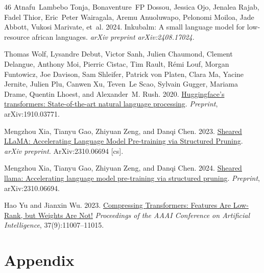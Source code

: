 \documentclass[11pt]{article}
\begin{document}
\begin{thebibliography}{46}
Atnafu~Lambebo Tonja, Bonaventure~FP Dossou, Jessica Ojo, Jenalea Rajab, Fadel Thior, Eric~Peter Wairagala, Aremu Anuoluwapo, Pelonomi Moiloa, Jade Abbott, Vukosi Marivate, et~al. 2024.
\newblock Inkubalm: A small language model for low-resource african languages.
\newblock \emph{arXiv preprint arXiv:2408.17024}.

Thomas Wolf, Lysandre Debut, Victor Sanh, Julien Chaumond, Clement Delangue, Anthony Moi, Pierric Cistac, Tim Rault, Rémi Louf, Morgan Funtowicz, Joe Davison, Sam Shleifer, Patrick von Platen, Clara Ma, Yacine Jernite, Julien Plu, Canwen Xu, Teven~Le Scao, Sylvain Gugger, Mariama Drame, Quentin Lhoest, and Alexander~M. Rush. 2020.
\newblock \href {https://arxiv.org/abs/1910.03771} {Huggingface's transformers: State-of-the-art natural language processing}.
\newblock \emph{Preprint}, arXiv:1910.03771.

Mengzhou Xia, Tianyu Gao, Zhiyuan Zeng, and Danqi Chen. 2023.
\newblock \href {http://arxiv.org/abs/2310.06694} {Sheared {LLaMA}: {Accelerating} {Language} {Model} {Pre}-training via {Structured} {Pruning}}.
\newblock \emph{arXiv preprint}.
\newblock ArXiv:2310.06694 [cs].

Mengzhou Xia, Tianyu Gao, Zhiyuan Zeng, and Danqi Chen. 2024.
\newblock \href {https://arxiv.org/abs/2310.06694} {Sheared llama: Accelerating language model pre-training via structured pruning}.
\newblock \emph{Preprint}, arXiv:2310.06694.

Hao Yu and Jianxin Wu. 2023.
\newblock \href {https://doi.org/10.1609/aaai.v37i9.26304} {Compressing {Transformers}: {Features} {Are} {Low}-{Rank}, but {Weights} {Are} {Not}!}
\newblock \emph{Proceedings of the AAAI Conference on Artificial Intelligence}, 37(9):11007--11015.

\end{thebibliography}

\newpage

\onecolumn
\twocolumn
\newpage

\appendix
\section{Appendix}
\end{document}
